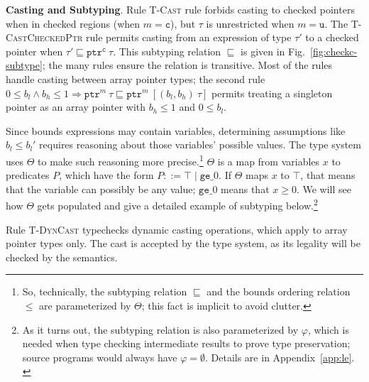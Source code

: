 \documentclass[conference]{IEEEtran}
\newcommand{\myparagraph}[1]{\textbf{#1}.\xspace}
\newcommand{\tarray}[3]{\tarrayb{({#1},{#2})}{#3}}
\newcommand{\tarrayb}[2]{\ensuremath{[{#1}~{#2}]}}
\newcommand{\tptr}[2]{\ensuremath{\mathtt{ptr}^{#2}~{#1}}}
\newcommand{\tarrayptr}[4]{{\tptr{\tarray{#1}{#2}{#3}}{#4}}}
\newcommand{\cmode}{\texttt{c}}
\newcommand{\umode}{\texttt{u}}
\providecommand{\DIFadd}[1]{{\protect\color{blue}\uwave{#1}}} %
\providecommand{\DIFaddbegin}{} %
\providecommand{\DIFaddend}{} %
\newcommand{\DIFaddincludegraphics}[2][]{{\color{blue}\fbox{\DIFOincludegraphics[#1]{#2}}}} %
\DeclareRobustCommand{\DIFaddbegin}{\DIFOaddbegin \let\includegraphics\DIFaddincludegraphics} %
\DeclareRobustCommand{\DIFaddend}{\DIFOaddend \let\includegraphics\DIFOincludegraphics} %
\begin{document}
\myparagraph{Casting and Subtyping}
Rule \textsc{T-Cast} rule forbids casting to checked pointers when in checked
regions (when $m = \cmode$), but $\tau$ is unrestricted when
$m = \umode$. The \textsc{T-CastCheckedPtr} rule
permits casting from an expression of type $\tau'$ to a checked pointer when
$\tau' \sqsubseteq \tptr{\tau}{\cmode}$. This subtyping relation
$\sqsubseteq$ is given in Fig.~\ref{fig:checkc-subtype}; the many
rules ensure the relation is transitive. Most of the rules handle
casting between array pointer types; the second rule 
$0\le b_l \wedge b_h \le 1 \Rightarrow \tptr{\tau}{m}\sqsubseteq
\tarrayptr{b_l}{b_h}{\tau}{m}$ permits treating a singleton
pointer as an array pointer with $b_h\le 1$ and $0 \le b_l$.

Since bounds expressions may
contain variables, determining assumptions like $b_l \leq b_l'$
requires reasoning about those variables' possible values. The type
system uses $\Theta$ to make such reasoning more precise.\footnote{So,
  technically, the subtyping relation $\sqsubseteq$ and the bounds
  ordering relation $\leq$ are parameterized by $\Theta$; this fact is
  implicit to avoid clutter.} $\Theta$ is a map from variables $x$ to
predicates $P$, which have the form $P ::= \top \;|\; \texttt{ge}\_0$.
If $\Theta$ maps $x$ to $\top$, that means that the variable can
possibly be any value; $\texttt{ge}\_0$ means that $x \ge 0$. We will
see how $\Theta$ gets populated and give a detailed example of
subtyping below.\footnote{As it turns out, the subtyping relation is
  also parameterized by $\varphi$, which is needed when type checking
  intermediate results to prove type preservation; source programs
  would always have $\varphi = \emptyset$. Details are in
\DIFaddbegin \iftr
  \DIFaddend Appendix~\ref{app:le}.
\DIFaddbegin \else
  \DIFadd{the supplemental report~}\cite{checkedc-tech-report}\DIFadd{.
}\fi
\DIFaddend }

Rule \textsc{T-DynCast} typechecks dynamic casting operations, which
apply to array pointer types only. The cast is accepted by the type
system, as its legality will be checked by the semantics.
\end{document}
